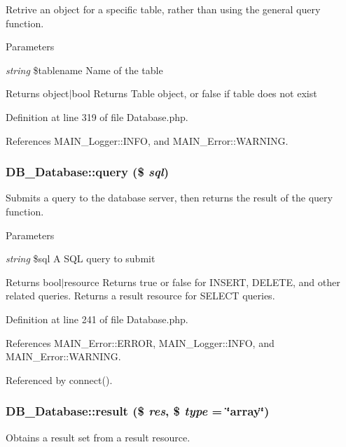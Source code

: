 Retrive an object for a specific table, rather than using the general query function.


\begin{DoxyParams}{Parameters}
\item[{\em string}]\$tablename Name of the table\end{DoxyParams}
\begin{DoxyReturn}{Returns}
object$|$bool Returns Table object, or false if table does not exist 
\end{DoxyReturn}


Definition at line 319 of file Database.php.

References MAIN\_\-Logger::INFO, and MAIN\_\-Error::WARNING.\hypertarget{classDB__Database_a67786f5c272e27980edf76a57fc16902}{
\subsubsection[{query}]{\setlength{\rightskip}{0pt plus 5cm}DB\_\-Database::query (\$ {\em sql})}}
\label{d3/d63/classDB__Database_a67786f5c272e27980edf76a57fc16902}
Submits a query to the database server, then returns the result of the query function.


\begin{DoxyParams}{Parameters}
\item[{\em string}]\$sql A SQL query to submit\end{DoxyParams}
\begin{DoxyReturn}{Returns}
bool$|$resource Returns true or false for INSERT, DELETE, and other related queries. Returns a result resource for SELECT queries. 
\end{DoxyReturn}


Definition at line 241 of file Database.php.

References MAIN\_\-Error::ERROR, MAIN\_\-Logger::INFO, and MAIN\_\-Error::WARNING.

Referenced by connect().\hypertarget{classDB__Database_a2739adb306d170f19c0e87a61a2bfc05}{
\subsubsection[{result}]{\setlength{\rightskip}{0pt plus 5cm}DB\_\-Database::result (\$ {\em res}, \/  \$ {\em type} = {\ttfamily \char`\"{}array\char`\"{}})}}
\label{d3/d63/classDB__Database_a2739adb306d170f19c0e87a61a2bfc05}
Obtains a result set from a result resource.


